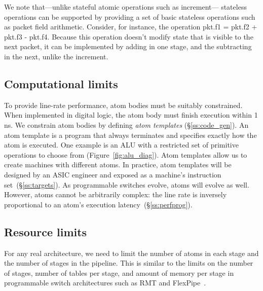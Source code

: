 We note that---unlike stateful atomic operations such as increment--- stateless
operations can be supported by providing a set of basic stateless operations
such as packet field arithmetic. Consider, for instance, the operation pkt.f1 =
pkt.f2 + pkt.f3 - pkt.f4. Because this operation doesn't modify state that is
visible to the next packet, it can be implemented by adding in one stage, and
the subtracting in the next, unlike the increment.

\subsection{Computational limits}
\label{s:atomConstraints}


To provide line-rate performance, atom bodies must be suitably constrained.
When implemented in digital logic, the atom body must finish execution within 1
ns. We constrain atom bodies by defining {\it atom templates}
(\S\ref{ss:code_gen}).  An atom template is a program that always terminates
and specifies exactly how the atom is executed. One example is an ALU with a
restricted set of primitive operations to choose from
(Figure~\ref{fig:alu_diag}). Atom templates allow us to create \absmachine
machines with different atoms.  In practice, atom templates will be designed by
an ASIC engineer and exposed as a machine's instruction
set~(\S\ref{ss:targets}).  As programmable switches evolve, atoms will evolve
as well.  However, atoms cannot be arbitrarily complex: the line rate is
inversely proportional to an atom's execution latency~(\S\ref{ss:perfprog}).

\subsection{Resource limits}
\label{s:resource}

For any real architecture, we need to limit the number of atoms in each stage
and the number of stages in the pipeline. This is similar to the limits on the
number of stages, number of tables per stage, and amount of memory per stage in
programmable switch architectures such as RMT and FlexPipe~\cite{lavanya_compiler}.
